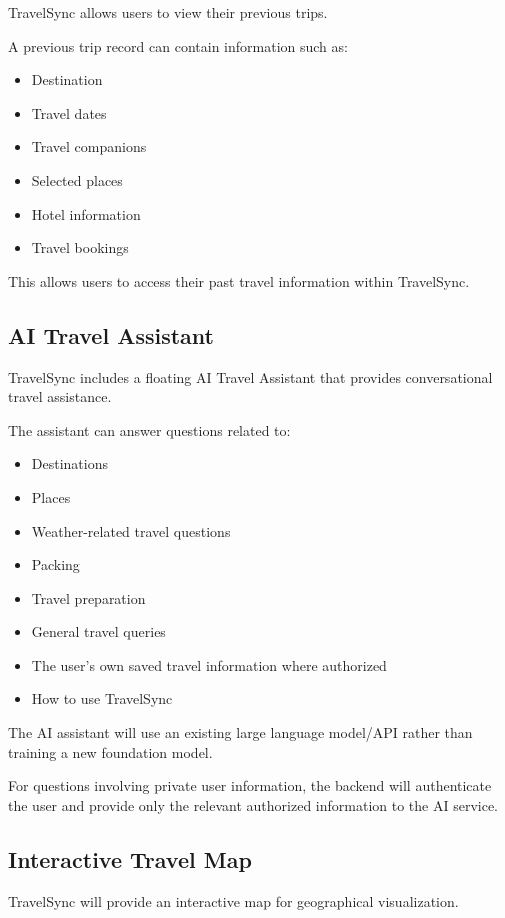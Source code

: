 \documentclass[11pt,a4paper]{article}
\begin{document}
TravelSync allows users to view their previous trips.

A previous trip record can contain information such as:

\begin{itemize}
\item Destination
\item Travel dates
\item Travel companions
\item Selected places
\item Hotel information
\item Travel bookings
\end{itemize}

This allows users to access their past travel information within TravelSync.


\subsection{AI Travel Assistant}

TravelSync includes a floating AI Travel Assistant that provides conversational travel assistance.

The assistant can answer questions related to:

\begin{itemize}
\item Destinations
\item Places
\item Weather-related travel questions
\item Packing
\item Travel preparation
\item General travel queries
\item The user's own saved travel information where authorized
\item How to use TravelSync
\end{itemize}

The AI assistant will use an existing large language model/API rather than training a new foundation model.

For questions involving private user information, the backend will authenticate the user and provide only the relevant authorized information to the AI service.


\subsection{Interactive Travel Map}

TravelSync will provide an interactive map for geographical visualization.
\end{document}
